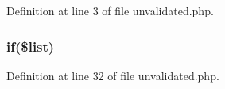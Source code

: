 Definition at line 3 of file unvalidated.\+php.

\subsubsection[{\texorpdfstring{if}{if}}]{\setlength{\rightskip}{0pt plus 5cm}if(\$list)}\hypertarget{unvalidated_8php_ad5b470d0a25b1bac17fbfa5e12e14b74}{}\label{unvalidated_8php_ad5b470d0a25b1bac17fbfa5e12e14b74}


Definition at line 32 of file unvalidated.\+php.


